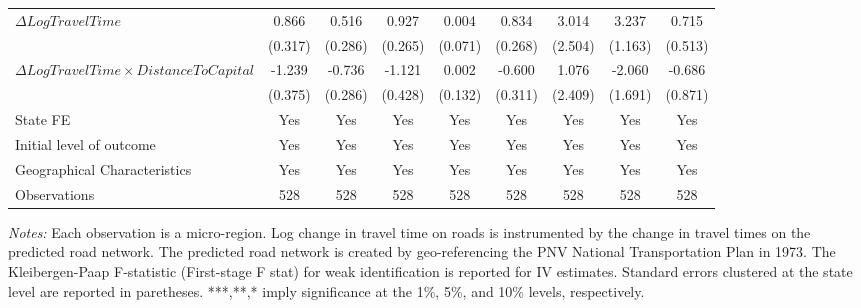 \begin{table}
{\begin{tabular}{l*{8}{c}}
$\Delta Log Travel Time$&       0.866\sym{**} &       0.516\sym{*}  &       0.927\sym{***}&       0.004         &       0.834\sym{***}&       3.014         &       3.237\sym{**} &       0.715         \\
&     (0.317)         &     (0.286)         &     (0.265)         &     (0.071)         &     (0.268)         &     (2.504)         &     (1.163)         &     (0.513)         \\
$\Delta Log Travel Time \times Distance To Capital$&      -1.239\sym{***}&      -0.736\sym{**} &      -1.121\sym{**} &       0.002         &      -0.600\sym{*}  &       1.076         &      -2.060         &      -0.686         \\
&     (0.375)         &     (0.286)         &     (0.428)         &     (0.132)         &     (0.311)         &     (2.409)         &     (1.691)         &     (0.871)         \\
State FE            &         Yes         &         Yes         &         Yes         &         Yes         &         Yes         &         Yes         &         Yes         &         Yes         \\
Initial level of outcome&         Yes         &         Yes         &         Yes         &         Yes         &         Yes         &         Yes         &         Yes         &         Yes         \\
Geographical Characteristics&         Yes         &         Yes         &         Yes         &         Yes         &         Yes         &         Yes         &         Yes         &         Yes         \\
Observations        &         528         &         528         &         528         &         528         &         528         &         528         &         528         &         528         \\

\hline\hline
\end{tabular}}
\endgroup
\begin{minipage}{\linewidth}
    \vspace{0.1cm}
    {\footnotesize \textit{Notes: }  Each observation is a micro-region. Log change in travel time on roads is instrumented by the change in travel times on the predicted road network. The predicted road network is created by geo-referencing the PNV National Transportation Plan in 1973. The Kleibergen-Paap F-statistic (First-stage F stat) for weak identification is reported for IV estimates. Standard errors clustered at the state level are reported in paretheses. ***,**,* imply significance at the 1\%, 5\%, and 10\% levels, respectively.}
\end{minipage}
\end{table}
